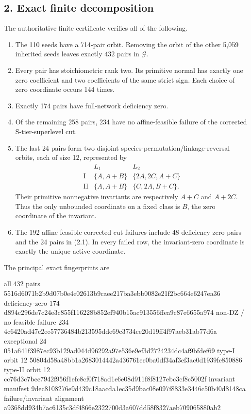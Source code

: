 \subsection{2. Exact finite
decomposition}

The authoritative finite certificate verifies all of the following.

\begin{enumerate}
\def\labelenumi{\arabic{enumi}.}
\tightlist
\item
  The 110 seeds have a 714-pair orbit. Removing the orbit of the other
  5,059 inherited seeds leaves exactly \(432\) pairs in \(\mathcal G\).
\item
  Every pair has stoichiometric rank two. Its primitive normal has
  exactly one zero coefficient and two coefficients of the same strict
  sign. Each choice of zero coordinate occurs 144 times.
\item
  Exactly 174 pairs have full-network deficiency zero.
\item
  Of the remaining 258 pairs, 234 have no affine-feasible failure of the
  corrected S-tier-superlevel cut.
\item
  The last 24 pairs form two disjoint
  species-permutation/linkage-reversal orbits, each of size 12,
  represented by \[
  \begin{array}{c|c|c}
    &L_1&L_2\\ \hline
  \mathrm I&\{A,A+B\}&\{2A,2C,A+C\}\\
  \mathrm {II}&\{A,A+B\}&\{C,2A,B+C\}.
  \end{array}                                        \tag{2.1}
  \] Their primitive nonnegative invariants are respectively \(A+C\) and
  \(A+2C\). Thus the only unbounded coordinate on a fixed class is
  \(B\), the zero coordinate of the invariant.
\item
  The 192 affine-feasible corrected-cut failures include 48
  deficiency-zero pairs and the 24 pairs in (2.1). In every failed row,
  the invariant-zero coordinate is exactly the unique active coordinate.
\end{enumerate}

The principal exact fingerprints are

\begin{CodeBlock}
all 432 pairs
5516d6071b2b9d07b0e4e02613b9caee217ba3ebb0082e21f2bc664e6247ea36
deficiency-zero 174
d894c296de7c24e3c855f116228b852ef940b15ac913556ffea9c87e6655a974
non-DZ / no feasible failure 234
4c6420ad47c2ee57736484b213595dde69c3734ce20d19ff4f97aeb31ab77d6a
exceptional 24
051a641f3987ec93b129ad044d96292a97e536e9ef3d2724234dc4af9bfdef69
type-I orbit 12
50804d58a48bb1a2683014442a436761ec0ba0df34af3ef3ac0d1939fe850886
type-II orbit 12
cc76d3c7bcc7942f956f1efc8cf0f718ad1e6e08d911f8f8127ebc3cf8c5002f
invariant manifest
9dec8108276e9d439c18aacda1ec35d9bac08e097f8833e3446c50b40d8148ca
failure/invariant alignment
a9368dd934b7ac6135c3df4866e2322700d3a607dd58f8327aeb709065880ab2
\end{CodeBlock}


